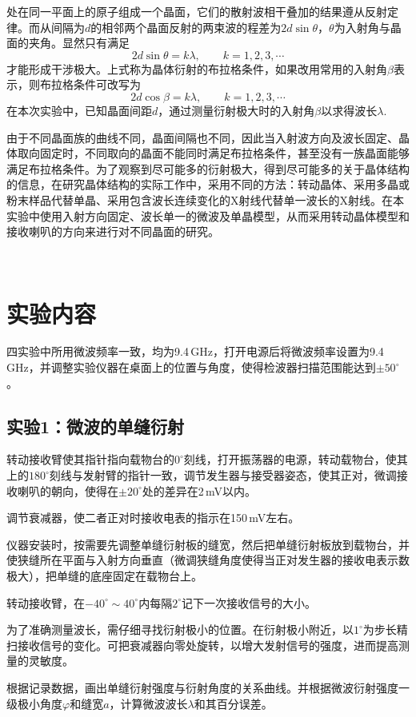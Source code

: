 \documentclass[UTF-8,twoside,cs4size]{ctexart}
\begin{document}
		处在同一平面上的原子组成一个晶面，它们的散射波相干叠加的结果遵从反射定律。而从间隔为$ d $的相邻两个晶面反射的两束波的程差为$ 2d\sin\theta $，$ \theta $为入射角与晶面的夹角。显然只有满足
		\[2d\sin\theta=k\lambda,\qquad k=1,2,3,\cdots\]
		才能形成干涉极大。上式称为晶体衍射的布拉格条件，如果改用常用的入射角$ \beta $表示，则布拉格条件可改写为
		\[2d\cos\beta=k\lambda,\qquad k=1,2,3,\cdots\]
		在本次实验中，已知晶面间距$ d $，通过测量衍射极大时的入射角$ \beta $以求得波长$\lambda$.
		
		由于不同晶面族的曲线不同，晶面间隔也不同，因此当入射波方向及波长固定、晶体取向固定时，不同取向的晶面不能同时满足布拉格条件，甚至没有一族晶面能够满足布拉格条件。为了观察到尽可能多的衍射极大，得到尽可能多的关于晶体结构的信息，在研究晶体结构的实际工作中，采用不同的方法：转动晶体、采用多晶或粉末样品代替单晶、采用包含波长连续变化的X射线代替单一波长的X射线。在本实验中使用入射方向固定、波长单一的微波及单晶模型，从而采用转动晶体模型和接收喇叭的方向来进行对不同晶面的研究。
		
		~\
		
	\section{实验内容}
	四实验中所用微波频率一致，均为9.4\,GHz，打开电源后将微波频率设置为9.4\,GHz，并调整实验仪器在桌面上的位置与角度，使得检波器扫描范围能达到$ \pm50^\circ $。
	
	\subsection{实验1：微波的单缝衍射}
	转动接收臂使其指针指向载物台的$ 0^\circ $刻线，打开振荡器的电源，转动载物台，使其上的$ 180^\circ $刻线与发射臂的指针一致，调节发生器与接受器姿态，使其正对，微调接收喇叭的朝向，使得在$ \pm20^\circ $处的差异在2\,mV以内。
	
	调节衰减器，使二者正对时接收电表的指示在150\,mV左右。
	
	仪器安装时，按需要先调整单缝衍射板的缝宽，然后把单缝衍射板放到载物台，并使狭缝所在平面与入射方向垂直（微调狭缝角度使得当正对发生器的接收电表示数极大），把单缝的底座固定在载物台上。
	
	转动接收臂，在$ -40^\circ\sim40^\circ $内每隔$ 2^\circ $记下一次接收信号的大小。
	
	为了准确测量波长，需仔细寻找衍射极小的位置。在衍射极小附近，以$ 1^\circ $为步长精扫接收信号的变化。可把衰减器向零处旋转，以增大发射信号的强度，进而提高测量的灵敏度。
	
	根据记录数据，画出单缝衍射强度与衍射角度的关系曲线。并根据微波衍射强度一级极小角度$ \varphi $和缝宽$a$，计算微波波长$\lambda$和其百分误差。
	
\end{document}
